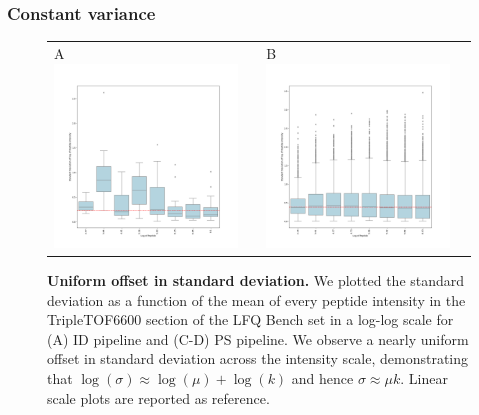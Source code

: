 \documentclass[11pt]{article}
\begin{document}
\subsubsection*{Constant variance}
\begin{figure}[hbt]
    \centering
    \centering
    \begin{tabular}{lclc} 
        A \includegraphics[width=0.5\linewidth]{../../result/report_plots_pipeline/quantile_bins_ID_median.png} & &%
        B \includegraphics[width=0.5\linewidth]{../../result/report_plots_pipeline/quantile_bins_PS_median.png} & \\%
    \end{tabular}
  \caption{{\bf Uniform offset in standard deviation.} We plotted the standard deviation as a function of the mean of every peptide intensity in the TripleTOF6600 section of the LFQ Bench set  in a log-log scale for (A) ID pipeline and (C-D) PS pipeline.  We observe a nearly uniform offset in standard deviation across the intensity scale, demonstrating that $\log(\sigma) \approx \log(\mu) + \log(k)$ and hence   $\sigma \approx \mu k$. Linear scale plots are reported as reference.  \label{fig:uniform_offset_in_standard_deviation_boxplot}}
\end{figure}
\end{document}
